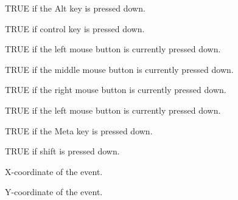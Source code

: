 


TRUE if the Alt key is pressed down.



TRUE if control key is pressed down.



TRUE if the left mouse button is currently pressed down.



TRUE if the middle mouse button is currently pressed down.



TRUE if the right mouse button is currently pressed down.



TRUE if the left mouse button is currently pressed down.



TRUE if the Meta key is pressed down.



TRUE if shift is pressed down.



X-coordinate of the event.



Y-coordinate of the event.



